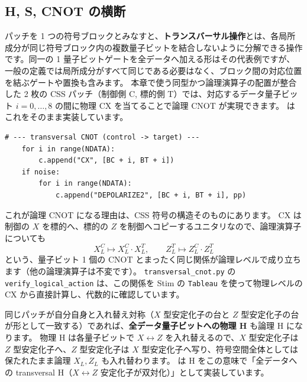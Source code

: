 \subsection{H, S, CNOT の横断}\label{subsec:hsc}

パッチを 1 つの符号ブロックとみなすと、\textbf{トランスバーサル操作}とは、各局所成分が同じ符号ブロック内の複数量子ビットを結合しないように分解できる操作です。同一の 1 量子ビットゲートを全データへ加える形はその代表例ですが、一般の定義では局所成分がすべて同じである必要はなく、ブロック間の対応位置を結ぶゲートや置換も含みます\cite{eastin2009transversal}。
本章で使う同型かつ論理演算子の配置が整合した 2 枚の CSS パッチ（制御側 C, 標的側 T）では、対応するデータ量子ビット $i=0,\dots,8$ の間に物理 CX を当てることで論理 CNOT が実現できます。
 はこれをそのまま実装しています。

\begin{lstlisting}[caption={パッチ間のトランスバーサル CX（src/stages/01\_mpp/src/ftqc/transversal\_cnot.py）}]
    # --- transversal CNOT (control -> target) ---
    for i in range(NDATA):
        c.append("CX", [BC + i, BT + i])
    if noise:
        for i in range(NDATA):
            c.append("DEPOLARIZE2", [BC + i, BT + i], pp)
\end{lstlisting}

これが論理 CNOT になる理由は、CSS 符号の構造そのものにあります。
CX は制御の $X$ を標的へ、標的の $Z$ を制御へコピーするユニタリなので、論理演算子についても
\begin{equation}
  X_L^C \longmapsto X_L^C \cdot X_L^T, \qquad Z_L^T \longmapsto Z_L^C \cdot Z_L^T
\end{equation}
という、量子ビット 1 個の CNOT とまったく同じ関係が論理レベルで成り立ちます（他の論理演算子は不変です）。
\texttt{transversal\_cnot.py} の \texttt{verify\_logical\_action} は、この関係を Stim の \texttt{Tableau} を使って物理レベルの CX から直接計算し、代数的に確認しています。

同じパッチが自分自身と入れ替え対称（$X$ 型安定化子の台と $Z$ 型安定化子の台が形として一致する）であれば、\textbf{全データ量子ビットへの物理 H} も論理 H になります。
物理 H は各量子ビットで $X \leftrightarrow Z$ を入れ替えるので、$X$ 型安定化子は $Z$ 型安定化子へ、$Z$ 型安定化子は $X$ 型安定化子へ写り、符号空間全体としては保たれたまま論理 $X_L, Z_L$ も入れ替わります。
 は H をこの意味で「全データへの transversal H（$X \leftrightarrow Z$ 安定化子が双対化）」として実装しています。

